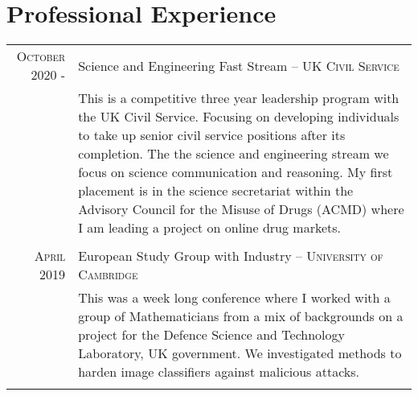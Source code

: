 \documentclass[a4paper,10pt]{article}
\begin{document}
\section{Professional Experience}
\begin{tabular}{r|p{15 cm}}
\textsc{October 2020 -} & Science and Engineering Fast Stream -- \textsc{UK Civil Service}\\&\footnotesize{This is a competitive three year leadership program with the UK Civil Service. Focusing on developing individuals to take up senior civil service positions after its completion. The the science and engineering stream we focus on science communication and reasoning. My first placement is in the science secretariat within the Advisory Council for the Misuse of Drugs (ACMD) where I am leading a project on online drug markets.}\\\multicolumn{2}{c}{} \\
\textsc{April 2019} & European Study Group with Industry -- \textsc{University of Cambridge}\\&\footnotesize{This was a week long conference where I worked with a group of Mathematicians from a mix of backgrounds on a project for the Defence Science and Technology Laboratory, UK government. We investigated methods to harden image classifiers against malicious attacks.}\\\multicolumn{2}{c}{} \\
\end{tabular}\\
\end{document}
